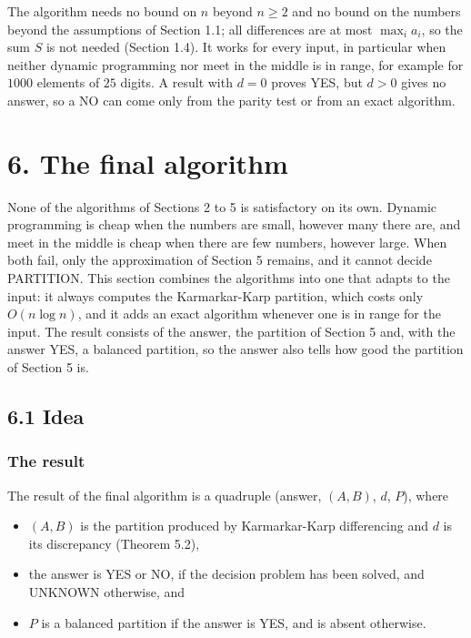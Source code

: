 \documentclass[
]{article}
\providecommand{\tightlist}{%
  \setlength{\itemsep}{0pt}\setlength{\parskip}{0pt}}
\begin{document}
The algorithm needs no bound on \(n\) beyond \(n \ge 2\) and no bound on
the numbers beyond the assumptions of Section 1.1; all differences are
at most \(\max_i a_i\), so the sum \(S\) is not needed (Section 1.4). It
works for every input, in particular when neither dynamic programming
nor meet in the middle is in range, for example for \(1000\) elements of
\(25\) digits. A result with \(d = 0\) proves YES, but \(d > 0\) gives
no answer, so a NO can come only from the parity test or from an exact
algorithm.

\hypertarget{the-final-algorithm}{%
\section{6. The final algorithm}\label{the-final-algorithm}}

None of the algorithms of Sections 2 to 5 is satisfactory on its own.
Dynamic programming is cheap when the numbers are small, however many
there are, and meet in the middle is cheap when there are few numbers,
however large. When both fail, only the approximation of Section 5
remains, and it cannot decide PARTITION. This section combines the
algorithms into one that adapts to the input: it always computes the
Karmarkar-Karp partition, which costs only \(O(n \log n)\), and it adds
an exact algorithm whenever one is in range for the input. The result
consists of the answer, the partition of Section 5 and, with the answer
YES, a balanced partition, so the answer also tells how good the
partition of Section 5 is.

\hypertarget{idea-4}{%
\subsection{6.1 Idea}\label{idea-4}}

\hypertarget{the-result}{%
\subsubsection{The result}\label{the-result}}

The result of the final algorithm is a quadruple (answer, \((A, B)\),
\(d\), \(P\)), where

\begin{itemize}
\tightlist
\item
  \((A, B)\) is the partition produced by Karmarkar-Karp differencing
  and \(d\) is its discrepancy (Theorem 5.2),
\item
  the answer is YES or NO, if the decision problem has been solved, and
  UNKNOWN otherwise, and
\item
  \(P\) is a balanced partition if the answer is YES, and is absent
  otherwise.
\end{itemize}
\end{document}
